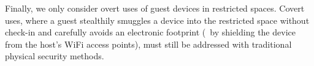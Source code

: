 
Finally, we only consider overt uses of guest devices in restricted spaces.
Covert uses, where a guest stealthily smuggles a device into the restricted
space without check-in and carefully avoids an electronic footprint (\eg~by
shielding the device from the host's WiFi access points), must still be
addressed with traditional physical security methods.
